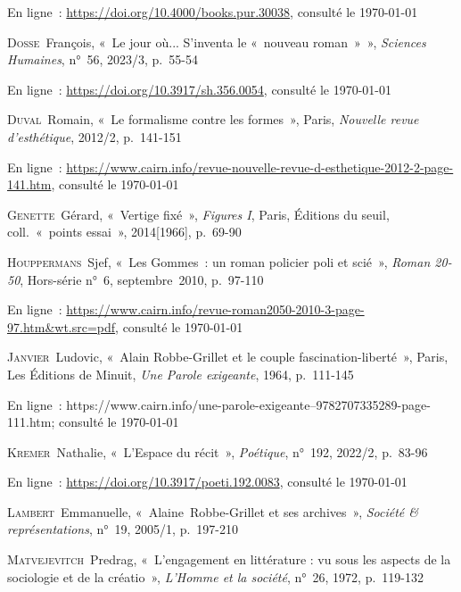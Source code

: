 \documentclass[12pt, a4paper]{article}
\begin{document}
            En ligne~: \hyperlink{https://doi.org/10.4000/books.pur.30038}{https://doi.org/10.4000/books.pur.30038}, consulté le \today
        \par
    \textsc{Dosse}~François, «~Le jour où... S'inventa le «~nouveau roman~»~»,  \textit{Sciences Humaines}, n°~56, 2023/3, p.~55-54
            
            En ligne~: \hyperlink{https://doi.org/10.3917/sh.356.0054}{https://doi.org/10.3917/sh.356.0054}, consulté le \today
        \par
    \textsc{Duval}~Romain, «~Le formalisme contre les formes~», Paris, \textit{Nouvelle revue d’esthétique}, 2012/2, p.~141-151
            
            En ligne~: \hyperlink{https://www.cairn.info/revue-nouvelle-revue-d-esthetique-2012-2-page-141.htm}{https://www.cairn.info/revue-nouvelle-revue-d-esthetique-2012-2-page-141.htm}, consulté le \today
        \par
    \textsc{Genette}~Gérard, «~Vertige fixé~», \textit{Figures I}, Paris, Éditions du seuil, coll.~«~points essai~», 2014[1966], p.~69-90\par
    \textsc{Houppermans}~Sjef, «~Les Gommes~: un roman policier poli et scié~»,  \textit{Roman 20-50}, Hors-série n°~6, septembre~2010, p.~97-110
            
            En ligne~: \hyperlink{https://www.cairn.info/revue-roman2050-2010-3-page-97.htm\&wt.src=pdf}{https://www.cairn.info/revue-roman2050-2010-3-page-97.htm\&wt.src=pdf}, consulté le \today
        \par
    \textsc{Janvier}~Ludovic, «~Alain Robbe-Grillet et le couple fascination-liberté~», Paris, Les Éditions de Minuit, \textit{Une Parole exigeante}, 1964, p.~111-145

En ligne~: https://www.cairn.info/une-parole-exigeante--9782707335289-page-111.htm; consulté le \today \par
    \textsc{Kremer}~Nathalie, «~L'Espace du récit~»,  \textit{Poétique}, n°~192, 2022/2, p.~83-96
            
            En ligne~: \hyperlink{https://doi.org/10.3917/poeti.192.0083}{https://doi.org/10.3917/poeti.192.0083}, consulté le \today
        \par
    \textsc{Lambert}~Emmanuelle, «~Alaine~Robbe-Grillet et ses archives~»,  \textit{Société \& représentations}, n°~19, 2005/1, p.~197-210\par
    \textsc{Matvejevitch}~Predrag, «~L'engagement en littérature : vu sous les aspects de la sociologie et de la créatio~»,  \textit{L'Homme et la société}, n°~26, 1972, p.~119-132
            
\end{document}
